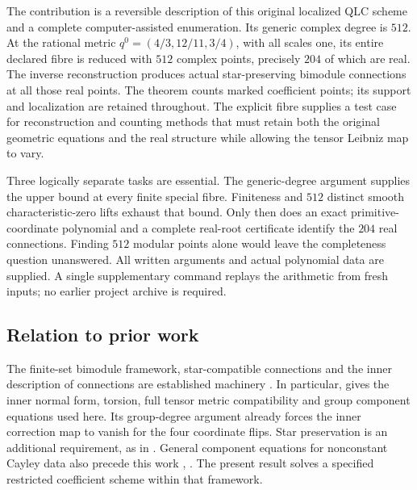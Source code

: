 \documentclass[11pt,a4paper]{article}
\theoremstyle{remark}\newtheorem{remark}[theorem]{Remark}
\begin{document}
The contribution is a reversible description of this original localized
QLC scheme and a complete computer-assisted enumeration. Its generic
complex degree is $512$. At the rational metric
$q^0=(4/3,12/11,3/4)$, with all scales one, its entire declared fibre is
reduced with $512$ complex points, precisely $204$ of which are real.
The inverse reconstruction produces actual star-preserving bimodule
connections at all those real points. The theorem counts marked
coefficient points; its support and localization are retained throughout.
The explicit fibre supplies a test case for reconstruction and counting
methods that must retain both the original geometric equations and the
real structure while allowing the tensor Leibniz map to vary.

Three logically separate tasks are essential. The generic-degree
argument supplies the upper bound at every finite special fibre. Finiteness
and $512$ distinct smooth characteristic-zero lifts exhaust that bound.
Only then does an exact primitive-coordinate polynomial and a complete
real-root certificate identify the $204$ real connections. Finding $512$
modular points alone would leave the completeness question unanswered.
All written arguments and actual polynomial data are supplied. A single
supplementary command replays the arithmetic from fresh inputs; no earlier
project archive is required.

\subsection{Relation to prior work}
The finite-set bimodule framework, star-compatible connections and the
inner description of connections are established machinery
\cite{beggs-majid-star,majid-graphs}. In particular,
\cite[Definition~8.3, Proposition~8.11 and Lemma~8.17,
pp.~568, 576--579 and 589--590]{orig-book} gives the inner normal form,
torsion, full tensor metric compatibility and group component equations
used here. Its group-degree argument already forces the inner correction
map to vanish for the four coordinate flips. Star preservation is an
additional requirement, as in \cite[Lemma~8.7, p.~572]{orig-book}.
General component equations for nonconstant Cayley data also precede
this work \cite[Section~6.1, Proposition~6.2 and Lemma~6.3]{orig-graphs24},
\cite[Section~2.2 and Lemma~2.1]{orig-polygon}. The present result solves a specified
restricted coefficient scheme within that framework.
\end{document}

